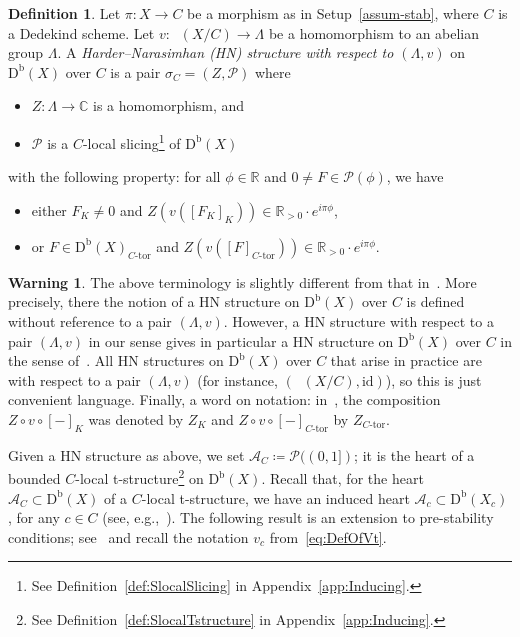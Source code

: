 \documentclass[11pt, reqno]{amsart}
\numberwithin{equation}{section}
\theoremstyle{plain}
\theoremstyle{remark}
\theoremstyle{definition}
\newtheorem{definition}[theorem]{Definition}
\newtheorem{warning}[theorem]{Warning}
\theoremstyle{italicsname}
\newcommand{\id}{\mathrm{id}}
\def\Ctor{{\ensuremath{C\text{-}\mathrm{tor}}}}
\newcommand{\Db}{\mathrm{D^b}}
\newcommand{\num}{\mathrm{num}}
\DeclareMathOperator{\Knum}{\rK_{\num}}
\newcommand{\cA}{\mathscr{A}}
\newcommand{\cP}{\mathscr{P}}
\newcommand{\rK}{\mathrm{K}}
\def\CC{\ensuremath{\mathbb{C}}}
\def\RR{\ensuremath{\mathbb{R}}}
\begin{document}
\begin{definition}\label{def:HNstructure}
Let $\pi \colon X\to C$ be a morphism as in Setup~\ref{assum-stab}, where $C$ is a Dedekind scheme. 
Let $v \colon \Knum(X/C) \to \Lambda$ be a homomorphism to an abelian group $\Lambda$. 
A \emph{Harder--Narasimhan (HN) structure with respect to $(\Lambda,v)$} on $\Db(X)$ over $C$ is a pair $\sigma_C=(Z,\cP)$ where
\begin{itemize}
\item $Z\colon\Lambda\to\CC$ is a homomorphism, and
\item $\cP$ is a $C$-local slicing\footnote{See Definition~\ref{def:SlocalSlicing} in Appendix~\ref{app:Inducing}.} of $\Db(X)$
\end{itemize}
with the following property: for all $\phi\in\RR$ and $0\neq F\in\cP(\phi)$, we have
\begin{itemize}
\item either $F_K\neq0$ and $Z(v([F_K]_K))\in\RR_{>0}\cdot e^{i\pi\phi}$,
\item or $F\in\Db(X)_{\Ctor}$ and $Z(v([F]_{\Ctor}))\in\RR_{>0}\cdot e^{i\pi\phi}$.
\end{itemize}
\end{definition}

\begin{warning}
    The above terminology is slightly different from that in~\cite[Definition 13.3]{stability-families}. 
    More precisely, there the notion of a HN structure on $\Db(X)$ over $C$ is defined without reference to a pair $(\Lambda, v)$. 
    However, a HN structure with respect to a pair $(\Lambda, v)$ in our sense gives in particular a HN structure on $\Db(X)$ over $C$ in the sense of~\cite[Definition 13.3]{stability-families}. 
    All HN structures on $\Db(X)$ over $C$ that arise in practice are with respect to a pair $(\Lambda, v)$ (for instance, $(\Knum(X/C), \id)$), so this is just convenient language.
    Finally, a word on notation: in~\cite{stability-families}, the composition $Z\circ v\circ [-]_K$ was denoted by $Z_K$ and $Z\circ v\circ [-]_{\Ctor}$ by $Z_{\Ctor}$.
\end{warning}

Given a HN structure as above, we set $\cA_C\coloneqq\cP((0,1])$; it is the heart of a bounded $C$-local t-structure\footnote{See Definition~\ref{def:SlocalTstructure} in Appendix~\ref{app:Inducing}.} on $\Db(X)$.
Recall that, for the heart $\cA_C\subset \Db(X)$ of a $C$-local t-structure, we have an induced heart $\cA_c\subset \Db(X_c)$, for any $c\in C$ (see, e.g.,~\cite[Theorem 5.7]{stability-families}). 
The following result is an extension to pre-stability conditions; see~\cite[Lemma 13.11]{stability-families} and recall the notation $v_c$ from~\eqref{eq:DefOfVt}.
\end{document}
